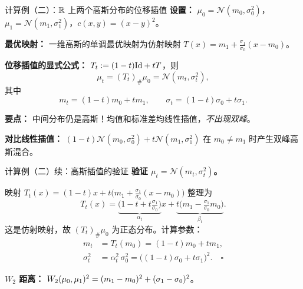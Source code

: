 \begin{frame}{计算例（二）：$\mathbb{R}$ 上两个高斯分布的位移插值}
  \textbf{设置：} $\mu_{0}=\mathcal{N}(m_{0},\sigma_{0}^{2})$，$\mu_{1}=\mathcal{N}(m_{1},\sigma_{1}^{2})$，$c(x,y)=(x-y)^{2}$。

  \textbf{最优映射：} 一维高斯的单调最优映射为仿射映射
  $T(x)=m_{1}+\tfrac{\sigma_{1}}{\sigma_{0}}(x-m_{0})$。

  \textbf{位移插值的显式公式：} $T_{t}:=(1-t)\mathrm{Id}+tT$，则
  \[
    \mu_{t}=(T_{t})_{\#}\mu_{0}=\mathcal{N}(m_{t},\sigma_{t}^{2}),
  \]
  其中
  \[
    m_{t}=(1-t)m_{0}+tm_{1},\qquad
    \sigma_{t}=(1-t)\sigma_{0}+t\sigma_{1}.
  \]

  \textbf{要点：} 中间分布仍是高斯！均值和标准差均线性插值，\emph{不出现双峰}。

  \textbf{对比线性插值：} $(1-t)\mathcal{N}(m_{0},\sigma_{0}^{2})+t\mathcal{N}(m_{1},\sigma_{1}^{2})$
  在 $m_{0}\ne m_{1}$ 时产生双峰高斯混合。

\end{frame}

\begin{frame}{计算例（二）续：高斯插值的验证}
  \textbf{验证 $\mu_{t}=\mathcal{N}(m_{t},\sigma_{t}^{2})$。}

  映射 $T_{t}(x)=(1-t)x+t\bigl(m_{1}+\tfrac{\sigma_{1}}{\sigma_{0}}(x-m_{0})\bigr)$ 整理为
  \[
    T_{t}(x)=\underbrace{\bigl(1-t+t\tfrac{\sigma_{1}}{\sigma_{0}}\bigr)}_{\alpha_{t}}x
             +\underbrace{t\bigl(m_{1}-\tfrac{\sigma_{1}}{\sigma_{0}}m_{0}\bigr)}_{\beta_{t}}.
  \]
  这是仿射映射，故 $(T_{t})_{\#}\mu_{0}$ 为正态分布。计算参数：
  \begin{align*}
    m_{t} &= T_{t}(m_{0})=(1-t)m_{0}+tm_{1},\\
    \sigma_{t}^{2} &= \alpha_{t}^{2}\,\sigma_{0}^{2}
    =\bigl((1-t)\sigma_{0}+t\sigma_{1}\bigr)^{2}.\quad\square
  \end{align*}

  \textbf{$W_{2}$ 距离：} $W_{2}(\mu_{0},\mu_{1})^{2}=(m_{1}-m_{0})^{2}+(\sigma_{1}-\sigma_{0})^{2}$。

\end{frame}

